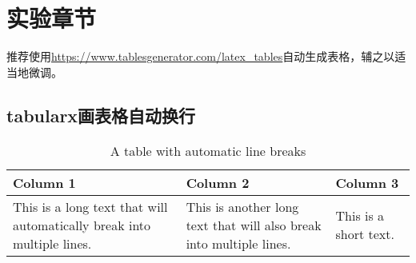 \setcounter{magicrownumbers}{0}
\chapter{实验章节}
\label{cha:4}
\par 推荐使用\url{https://www.tablesgenerator.com/latex_tables}自动生成表格，辅之以适当地微调。
\section{tabularx画表格自动换行}
\begin{table}[htbp]
    \caption{A table with automatic line breaks}
    \begin{tabularx}{\textwidth}{|X|X|X|}
    \hline
    \textbf{Column 1} & \textbf{Column 2} & \textbf{Column 3} \\
    \hline
    This is a long text that will automatically break into multiple lines. & This is another long text that will also break into multiple lines. & This is a short text. \\
    \hline
    \end{tabularx}
    \end{table}
